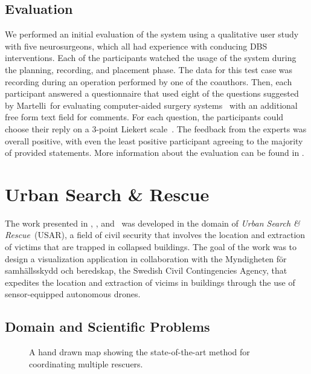 \subsection{Evaluation} \label{contributions:dbs:evaluation}
We performed an initial evaluation of the system using a qualitative user study with five neurosurgeons, which all had experience with conducing DBS interventions.  Each of the participants watched the usage of the system during the planning, recording, and placement phase.  The data for this test case was recording during an operation performed by one of the coauthors.  Then, each participant answered a questionnaire that used eight of the questions suggested by Martelli~\etal for evaluating computer-aided surgery systems~\cite{martelli2003criteria} with an additional free form text field for comments.  For each question, the participants could choose their reply on a 3-point Liekert scale~\cite{likert1932technique}.  The feedback from the experts was overall positive, with even the least positive participant agreeing to the majority of provided statements.  More information about the evaluation can be found in \paperDBS.






\section{Urban Search \& Rescue} \label{contributions:usar}
The work presented in \paperVMV, \paperSSRR, and \paperCGF\ was developed in the domain of \emph{Urban Search \& Rescue}~(USAR), a field of civil security that involves the location and extraction of victims that are trapped in collapsed buildings.  The goal of the work was to design a visualization application in collaboration with the Myndigheten f\"or samh\"allsskydd och beredskap, the Swedish Civil Contingencies Agency, that expedites the location and extraction of vicims in buildings through the use of sensor-equipped autonomous drones.


\subsection{Domain and Scientific Problems} \label{contributions:usar:background}
\begin{figure}
\centering
{}
\caption{A hand drawn map showing the state-of-the-art method for coordinating multiple rescuers.}
\label{contributions:usar:map:hand}
\end{figure}

